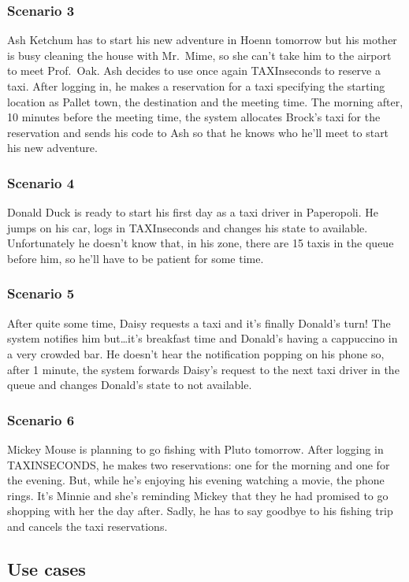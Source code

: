 \documentclass{article}
\begin{document}
\subsubsection{Scenario 3}
Ash Ketchum has to start his new adventure in Hoenn tomorrow but his mother is busy cleaning the house with Mr.\ Mime, so she can't take him to the airport to meet Prof.\ Oak. Ash decides to use once again TAXInseconds to reserve a taxi. After logging in, he makes a reservation for a taxi specifying the starting location as Pallet town, the destination and the meeting time. The morning after, 10 minutes before the meeting time, the system allocates Brock's taxi for the reservation and sends his code to Ash so that he knows who he'll meet to start his new adventure. 
\subsubsection{Scenario 4}
Donald Duck is ready to start his first day as a taxi driver in Paperopoli. He jumps on his car, logs in TAXInseconds and changes his state to available. Unfortunately he doesn't know that, in his zone, there are 15 taxis in the queue before him, so he'll have to be patient for some time.
\subsubsection{Scenario 5}
After quite some time, Daisy requests a taxi and it's finally Donald's turn! The system notifies him but\ldots it's breakfast time and Donald's having a cappuccino in a very crowded bar. He doesn't hear the notification popping on his phone so, after 1 minute, the system forwards Daisy's request to the next taxi driver in the queue and changes Donald's state to not available.
\subsubsection{Scenario 6}
Mickey Mouse is planning to go fishing with Pluto tomorrow. After logging in TAXINSECONDS, he makes two reservations: one for the morning and one for the evening. But, while he's enjoying his evening watching a movie, the phone rings. It's Minnie and she's reminding Mickey that they he had promised to go shopping with her the day after. Sadly, he has to say goodbye to his fishing trip and cancels the taxi reservations.

\subsection{Use cases}
\end{document}
